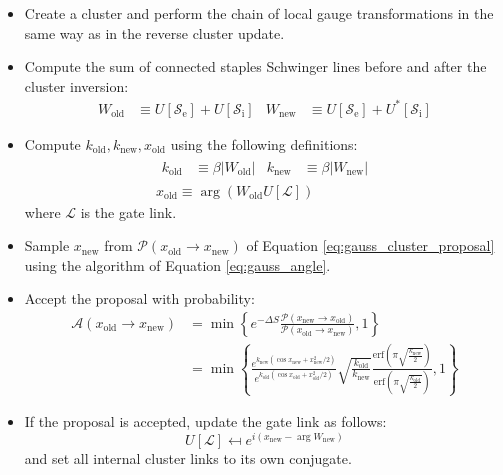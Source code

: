 \begin{itemize}
    \item
        Create a cluster and perform the chain of local gauge transformations in the same way as in the reverse cluster update.
    \item
        Compute the sum of connected staples Schwinger lines before and after the cluster inversion:
        \[\begin{aligned}
            W_\mathrm{old} &\equiv U[\mathcal S_\mathrm{e}] + U[\mathcal S_\mathrm{i}] &
            W_\mathrm{new} &\equiv U[\mathcal S_\mathrm{e}] + U^*[\mathcal S_\mathrm{i}]
        \end{aligned}\]
    \item
        Compute $k_\mathrm{old}, k_\mathrm{new}, x_\mathrm{old}$ using the following definitions:
        \[\begin{gathered}
            \begin{aligned}
                k_\mathrm{old} &\equiv \beta|W_\mathrm{old}| & k_\mathrm{new} &\equiv \beta|W_\mathrm{new}|
            \end{aligned}\\
            x_\mathrm{old} \equiv \arg(W_\mathrm{old}U[\mathcal L])
        \end{gathered}\]
        where $\mathcal L$ is the gate link.
    \item
        Sample $x_\mathrm{new}$ from $\mathcal P(x_\mathrm{old}\to x_\mathrm{new})$ of Equation \eqref{eq:gauss_cluster_proposal}
        using the algorithm of Equation \eqref{eq:gauss_angle}.
    \item
        Accept the proposal with probability:
        \[\begin{aligned}
            \mathcal A(x_\mathrm{old}\to x_\mathrm{new}) &= \min\left\{e^{-\Delta S}\frac{\mathcal P(x_\mathrm{new}\to x_\mathrm{old})}{\mathcal P(x_\mathrm{old}\to x_\mathrm{new})},1\right\} \\
            &= \min\left\{\frac{e^{k_\mathrm{new}(\cos x_\mathrm{new}+x_\mathrm{new}^2/2)}}{e^{k_\mathrm{old}(\cos x_\mathrm{old}+x_\mathrm{old}^2/2)}}
              \sqrt{\frac{k_\mathrm{old}}{k_\mathrm{new}}}\frac{\mathrm{erf}\left(\pi\sqrt{\frac{k_\mathrm{new}}{2}}\right)}{\mathrm{erf}\left(\pi\sqrt{\frac{k_\mathrm{old}}{2}}\right)},1\right\}
        \end{aligned}\]
    \item
        If the proposal is accepted, update the gate link as follows:
        \[
            U[\mathcal L] \mapsfrom e^{i(x_\mathrm{new}-\arg W_\mathrm{new})}
        \]
        and set all internal cluster links to its own conjugate.
\end{itemize}

